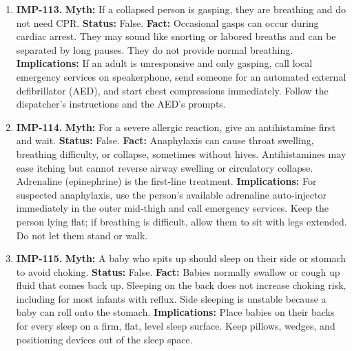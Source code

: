 \documentclass[11pt,oneside]{book}
\begin{document}
\begin{enumerate}[leftmargin=0pt,labelwidth=0pt,labelsep=0pt,itemindent=0pt]
\textbf{Implications:} Advice about contact or treatment depends on the cause. Seek urgent help for a rash with difficulty breathing or swelling of the lips or tongue.
\item[] \textbf{IMP-113.} \textbf{Myth:} If a collapsed person is gasping, they are breathing and do not need CPR.\newline
\textbf{Status:} False.\newline
\textbf{Fact:} Occasional gasps can occur during cardiac arrest. They may sound like snorting or labored breaths and can be separated by long pauses. They do not provide normal breathing. \cite{ref499}\newline
\textbf{Implications:} If an adult is unresponsive and only gasping, call local emergency services on speakerphone, send someone for an automated external defibrillator (AED), and start chest compressions immediately. Follow the dispatcher's instructions and the AED's prompts.
\item[] \textbf{IMP-114.} \textbf{Myth:} For a severe allergic reaction, give an antihistamine first and wait.\newline
\textbf{Status:} False.\newline
\textbf{Fact:} Anaphylaxis can cause throat swelling, breathing difficulty, or collapse, sometimes without hives. Antihistamines may ease itching but cannot reverse airway swelling or circulatory collapse. Adrenaline (epinephrine) is the first-line treatment. \cite{ref500}\newline
\textbf{Implications:} For suspected anaphylaxis, use the person's available adrenaline auto-injector immediately in the outer mid-thigh and call emergency services. Keep the person lying flat; if breathing is difficult, allow them to sit with legs extended. Do not let them stand or walk.
\item[] \textbf{IMP-115.} \textbf{Myth:} A baby who spits up should sleep on their side or stomach to avoid choking.\newline
\textbf{Status:} False.\newline
\textbf{Fact:} Babies normally swallow or cough up fluid that comes back up. Sleeping on the back does not increase choking risk, including for most infants with reflux. Side sleeping is unstable because a baby can roll onto the stomach. \cite{ref501}\newline
\textbf{Implications:} Place babies on their backs for every sleep on a firm, flat, level sleep surface. Keep pillows, wedges, and positioning devices out of the sleep space.

\end{enumerate}
\end{document}
